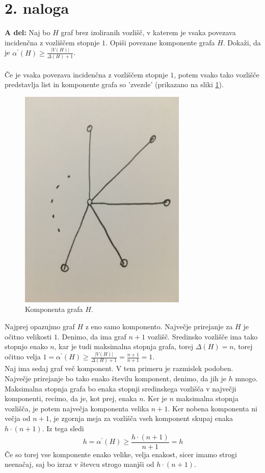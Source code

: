 \documentclass[a4paper,11pt]{article}
\begin{document}
\newpage
\section*{2. naloga}

\textbf{A del:}
Naj bo $H$ graf brez izoliranih vozlišč, v katerem je vsaka povezava incidenčna z vozliščem stopnje $1$. Opiši povezane komponente grafa $H$. Dokaži, da je $\alpha^{'}(H) \geq \frac{|V(H)|}{\Delta (H) + 1}$.
\\
\\
Če je vsaka povezava incidenčna z vozliščem stopnje $1$, potem vsako tako vozlišče predstavlja list in komponente grafa so 'zvezde' (prikazano na sliki \ref{zvezda}).
\begin{figure}[ht!]
    \centering
    \includegraphics[width=80mm]{zvezda.JPG}
    \caption{Komponenta grafa $H$.}\label{zvezda}
\end{figure}

\noindent
Najprej opazujmo graf $H$ z eno samo komponento.
Največje prirejanje za $H$ je očitno velikosti $1$. 
Denimo, da ima graf $n + 1$ vozlišč. Sredinsko vozlišče ima tako stopnjo enako $n$, kar je tudi maksimalna stopnja grafa, torej $\Delta(H) = n$, torej očitno velja $1 = \alpha^{'}(H) \geq \frac{|V(H)|}{\Delta (H) + 1} = \frac{n + 1}{n + 1} = 1$. 
\\
Naj ima sedaj graf več komponent. V tem primeru je razmislek podoben. Največje prirejanje bo tako enako številu komponent, denimo, da jih je $h$ mnogo.
Maksimalna stopnja grafa bo enaka stopnji sredinskega vozlišča v največji komponenti, recimo, da je, kot prej, enaka $n$. 
Ker je $n$ maksimalna stopnja vozlišča, je potem največja komponenta velika $n + 1$. Ker nobena komponenta ni večja od $n + 1$, je zgornja meja za vozlišča vseh komponent skupaj enaka $h \cdot (n + 1)$. Iz tega sledi
$$
h = \alpha^{'}(H) \geq \frac{h \cdot (n + 1)}{n + 1} = h
$$
Če so torej vse komponente enako velike, velja enakost, sicer imamo strogi neenačaj, saj bo izraz v števcu strogo manjši od $h \cdot (n + 1)$.
\\
\end{document}
